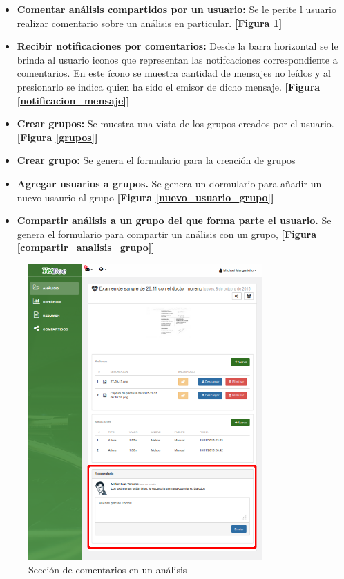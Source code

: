 	\begin{itemize}
		\item \textbf{Comentar análisis compartidos por un usuario:} Se le perite l usuario realizar comentario sobre un análisis en particular. \textbf{[Figura \ref{realizar_comentario}]}
		\item \textbf{Recibir notificaciones por comentarios:} Desde la barra horizontal se le brinda al usuario iconos que representan las notifcaciones correspondiente a comentarios. En este ícono se muestra cantidad de mensajes no leídos y al presionarlo se indica quien ha sido el emisor de dicho mensaje. \textbf{[Figura \ref{notificacion_mensaje}]}
		\item \textbf{Crear grupos: } Se muestra una vista de los grupos creados por el usuario. \textbf{[Figura  \ref{grupos}]}
		\item \textbf{Crear grupo: } Se genera el formulario para la creación de grupos 
		\item \textbf{Agregar usuarios a grupos.} Se genera un dormulario para añadir un nuevo usaurio al grupo \textbf{[Figura \ref{nuevo_usuario_grupo}]}
		\item \textbf{Compartir análisis a un grupo del que forma parte el usuario.} Se genera el formulario para compartir un análisis con un grupo, \textbf{[Figura \ref{compartir_analisis_grupo}]}
	\end{itemize}
	
	
	    \begin{figure}[h]
	    	\centering
	    	\includegraphics[width=0.8\textwidth]{img/realizar_comentario}
	    	\caption{Sección de comentarios en un análisis}
	    	\label{realizar_comentario}
	    \end{figure}


